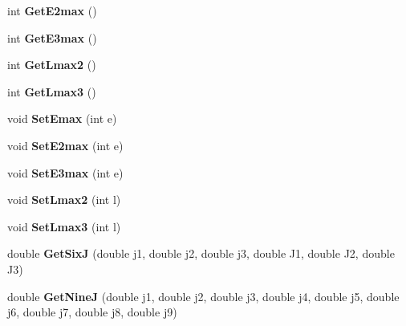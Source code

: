 \begin{DoxyCompactItemize}
\item 
int {\bfseries Get\+E2max} ()\hypertarget{classModelSpace_ad5289ea77c79b0ce4d9a9824374cad04}{}\label{classModelSpace_ad5289ea77c79b0ce4d9a9824374cad04}

\item 
int {\bfseries Get\+E3max} ()\hypertarget{classModelSpace_a43b38395bba0af89b60a24dbe1323a07}{}\label{classModelSpace_a43b38395bba0af89b60a24dbe1323a07}

\item 
int {\bfseries Get\+Lmax2} ()\hypertarget{classModelSpace_a876da946190e1a04ed1f72a2097f93ac}{}\label{classModelSpace_a876da946190e1a04ed1f72a2097f93ac}

\item 
int {\bfseries Get\+Lmax3} ()\hypertarget{classModelSpace_a3ec5612a3064eac5bafbf0b2709c5cc0}{}\label{classModelSpace_a3ec5612a3064eac5bafbf0b2709c5cc0}

\item 
void {\bfseries Set\+Emax} (int e)\hypertarget{classModelSpace_ad28541b219257d967a299046e6b6e9e5}{}\label{classModelSpace_ad28541b219257d967a299046e6b6e9e5}

\item 
void {\bfseries Set\+E2max} (int e)\hypertarget{classModelSpace_ad970185c03f12be950c4ca3903370a64}{}\label{classModelSpace_ad970185c03f12be950c4ca3903370a64}

\item 
void {\bfseries Set\+E3max} (int e)\hypertarget{classModelSpace_ae46d0574068271181e382122289c8e61}{}\label{classModelSpace_ae46d0574068271181e382122289c8e61}

\item 
void {\bfseries Set\+Lmax2} (int l)\hypertarget{classModelSpace_a847073aa2793e18799ddb36e6a7c32a7}{}\label{classModelSpace_a847073aa2793e18799ddb36e6a7c32a7}

\item 
void {\bfseries Set\+Lmax3} (int l)\hypertarget{classModelSpace_a426ef832829aef84c3c74fa5a0b28f29}{}\label{classModelSpace_a426ef832829aef84c3c74fa5a0b28f29}

\item 
double {\bfseries Get\+SixJ} (double j1, double j2, double j3, double J1, double J2, double J3)\hypertarget{classModelSpace_a716c2bf4a6b42c1c27579b0b7804252e}{}\label{classModelSpace_a716c2bf4a6b42c1c27579b0b7804252e}

\item 
double {\bfseries Get\+NineJ} (double j1, double j2, double j3, double j4, double j5, double j6, double j7, double j8, double j9)\hypertarget{classModelSpace_ab9303a5a0cc4513bf4ed4430d9fe86a6}{}\label{classModelSpace_ab9303a5a0cc4513bf4ed4430d9fe86a6}


\end{DoxyCompactItemize}
